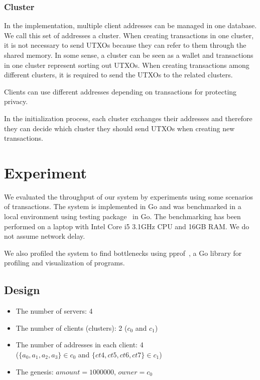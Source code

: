 \documentclass[a4paper, oneside]{discothesis}
\begin{document}
\subsection{Cluster}
In the implementation, multiple client addresses can be managed in one database.
We call this set of addresses a cluster.
When creating transactions in one cluster, it is not necessary to send UTXOs
because they can refer to them through the shared memory.
In some sense, a cluster can be seen as a wallet and transactions in one cluster
represent sorting out UTXOs.
When creating transactions among different clusters, it is required to send the UTXOs to the related clusters.

Clients can use different addresses depending on transactions for protecting privacy.

In the initialization process, each cluster exchanges their addresses and therefore they can decide which cluster they should send UTXOs when creating new transactions.


\chapter{Experiment}
We evaluated the throughput of our system by experiments using some scenarios of transactions.
The system is implemented in Go and was benchmarked in a local environment
using testing package~\cite{testing, flags} in Go.
The benchmarking has been performed on a laptop with Intel Core i5 3.1GHz CPU and 16GB RAM.
We do not assume network delay.

We also profiled the system to find bottlenecks using pprof~\cite{pprof, profiling},
a Go library for profiling and visualization of programs.

\section{Design}
\begin{itemize}
    \item The number of servers: 4
    \item The number of clients (clusters): 2 ($c_0$ and $c_1$)
    \item The number of addresses in each client: 4\\
        ($\{a_0, a_1, a_2, a_3\} \in c_0$ and $\{ct4, ct5, ct6, ct7\} \in c_1$)
    \item The genesis: $amount = 1000000$, $owner = c_0$
\end{itemize}
\end{document}
